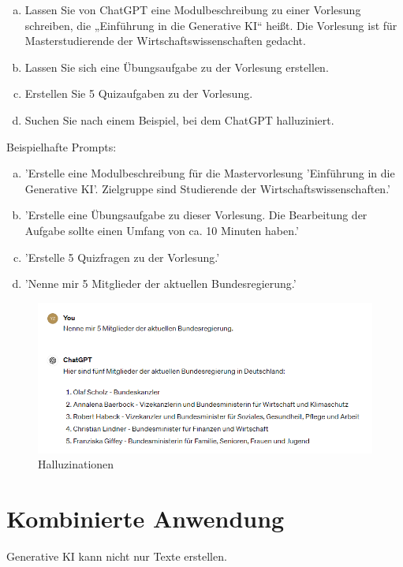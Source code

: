 \documentclass[12pt,ngerman]{AssignmentClass}
\begin{document}
        \begin{enumerate}[a)]
    		\item Lassen Sie von ChatGPT eine Modulbeschreibung zu einer Vorlesung schreiben, die „Einführung in die Generative KI“ heißt. Die Vorlesung ist für Masterstudierende der Wirtschaftswissenschaften gedacht.
    		\item Lassen Sie sich eine Übungsaufgabe zu der Vorlesung erstellen.
    		\item Erstellen Sie 5 Quizaufgaben zu der Vorlesung.
            \item Suchen Sie nach einem Beispiel, bei dem ChatGPT halluziniert.
    	\end{enumerate}

        \vspace{5mm}
        Beispielhafte Prompts:
        \begin{enumerate}[a)]
    		\item 'Erstelle eine Modulbeschreibung für die Mastervorlesung 'Einführung in die Generative KI'. Zielgruppe sind Studierende der Wirtschaftswissenschaften.'
    		\item 'Erstelle eine Übungsaufgabe zu dieser Vorlesung. Die Bearbeitung der Aufgabe sollte einen Umfang von ca. 10 Minuten haben.'
    		\item 'Erstelle 5 Quizfragen zu der Vorlesung.'
            \item 'Nenne mir 5 Mitglieder der aktuellen Bundesregierung.'
    	\end{enumerate}

        \begin{figure}
            \centering
            \includegraphics[width=0.5\linewidth]{2024-04-22 10_18_58-ChatGPT.png}
            \caption{Halluzinationen}
            \label{fig:hallucinations}
        \end{figure}
    
    
    \section{Kombinierte Anwendung}
    
        Generative KI kann nicht nur Texte erstellen.
        
\end{document}
